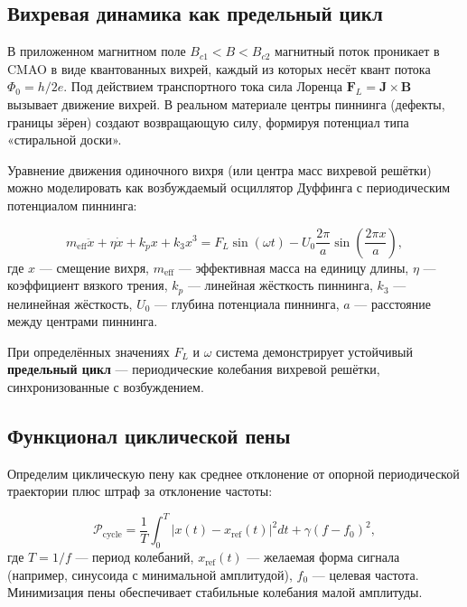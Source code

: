 \documentclass[12pt,a4paper]{article}
\numberwithin{equation}{section}
\begin{document}
\subsection{Вихревая динамика как предельный цикл}

В приложенном магнитном поле $B_{c1} < B < B_{c2}$ магнитный поток проникает в CMAO в виде квантованных вихрей, каждый из которых несёт квант потока $\Phi_0 = h/2e$. Под действием транспортного тока сила Лоренца $\mathbf{F}_L = \mathbf{J} \times \mathbf{B}$ вызывает движение вихрей. В реальном материале центры пиннинга (дефекты, границы зёрен) создают возвращающую силу, формируя потенциал типа «стиральной доски».

Уравнение движения одиночного вихря (или центра масс вихревой решётки) можно моделировать как возбуждаемый осциллятор Дуффинга с периодическим потенциалом пиннинга:

\begin{equation}
m_{\text{eff}} \ddot{x} + \eta \dot{x} + k_p x + k_3 x^3 = F_L \sin(\omega t) - U_0 \frac{2\pi}{a} \sin\left(\frac{2\pi x}{a}\right),
\label{eq:vortex_eq}
\end{equation}
где $x$ — смещение вихря, $m_{\text{eff}}$ — эффективная масса на единицу длины, $\eta$ — коэффициент вязкого трения, $k_p$ — линейная жёсткость пиннинга, $k_3$ — нелинейная жёсткость, $U_0$ — глубина потенциала пиннинга, $a$ — расстояние между центрами пиннинга.

При определённых значениях $F_L$ и $\omega$ система демонстрирует устойчивый \textbf{предельный цикл} — периодические колебания вихревой решётки, синхронизованные с возбуждением.

\subsection{Функционал циклической пены}

Определим циклическую пену как среднее отклонение от опорной периодической траектории плюс штраф за отклонение частоты:

\begin{equation}
\mathcal{P}_{\text{cycle}} = \frac{1}{T} \int_0^T \left| x(t) - x_{\text{ref}}(t) \right|^2 dt + \gamma (f - f_0)^2,
\label{eq:Pcycle}
\end{equation}
где $T = 1/f$ — период колебаний, $x_{\text{ref}}(t)$ — желаемая форма сигнала (например, синусоида с минимальной амплитудой), $f_0$ — целевая частота. Минимизация пены обеспечивает стабильные колебания малой амплитуды.
\end{document}
